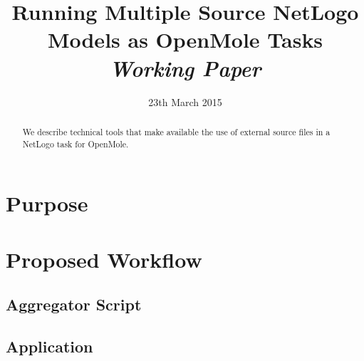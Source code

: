 


\title{Running Multiple Source NetLogo Models as OpenMole Tasks\bigskip\\
\textit{Working Paper}
}
\author{}
\date{23th March 2015}


\maketitle

\begin{abstract}
We describe technical tools that make available the use of external source files in a NetLogo task for OpenMole.
\end{abstract}


\section{Purpose}


\section{Proposed Workflow}

\subsection{Aggregator Script}



\subsection{Application}

















